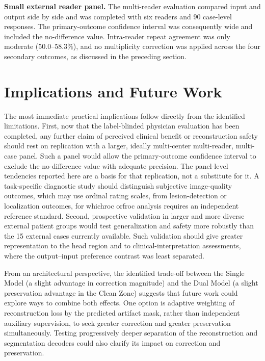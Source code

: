 \textbf{Small external reader panel.} The multi-reader evaluation compared input and output side by side and was completed with six readers and 90 case-level responses. The primary-outcome confidence interval was consequently wide and included the no-difference value. Intra-reader repeat agreement was only moderate ($50.0$--$58.3\%$), and no multiplicity correction was applied across the four secondary outcomes, as discussed in the preceding section.

\section{Implications and Future Work}

The most immediate practical implications follow directly from the identified limitations. First, now that the label-blinded physician evaluation has been completed, any further claim of perceived clinical benefit or reconstruction safety should rest on replication with a larger, ideally multi-center multi-reader, multi-case panel. Such a panel would allow the primary-outcome confidence interval to exclude the no-difference value with adequate precision. The panel-level tendencies reported here are a basis for that replication, not a substitute for it. A task-specific diagnostic study should distinguish subjective image-quality outcomes, which may use ordinal rating scales, from lesion-detection or localization outcomes, for which\acrshort{roc} or\acrshort{froc} analysis requires an independent reference standard. Second, prospective validation in larger and more diverse external patient groups would test generalization and safety more robustly than the 15 external cases currently available. Such validation should give greater representation to the head region and to clinical-interpretation assessments, where the output--input preference contrast was least separated.

From an architectural perspective, the identified trade-off between the Single Model (a slight advantage in correction magnitude) and the Dual Model (a slight preservation advantage in the Clean Zone) suggests that future work could explore ways to combine both effects. One option is adaptive weighting of reconstruction loss by the predicted artifact mask, rather than independent auxiliary supervision, to seek greater correction and greater preservation simultaneously. Testing progressively deeper separation of the reconstruction and segmentation decoders could also clarify its impact on correction and preservation.

